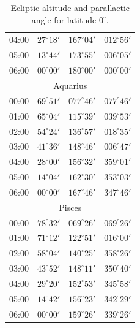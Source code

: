 \begin{table}[!h]
\begin{Parallel}{}{}
{{\begin{tabular}{l|lll}
04:00 & $27^\circ 18'$ & $167^\circ 04'$ & $012^\circ 56'$\\
05:00 & $13^\circ 44'$ & $173^\circ 55'$ & $006^\circ 05'$\\
06:00 & $00^\circ 00'$ & $180^\circ 00'$ & $000^\circ 00'$\\
\multicolumn{4}{c}{Aquarius}\\
00:00 & $69^\circ 51'$ & $077^\circ 46'$ & $077^\circ 46'$\\
01:00 & $65^\circ 04'$ & $115^\circ 39'$ & $039^\circ 53'$\\
02:00 & $54^\circ 24'$ & $136^\circ 57'$ & $018^\circ 35'$\\
03:00 & $41^\circ 36'$ & $148^\circ 46'$ & $006^\circ 47'$\\
04:00 & $28^\circ 00'$ & $156^\circ 32'$ & $359^\circ 01'$\\
05:00 & $14^\circ 04'$ & $162^\circ 30'$ & $353^\circ 03'$\\
06:00 & $00^\circ 00'$ & $167^\circ 46'$ & $347^\circ 46'$\\
\multicolumn{4}{c}{Pisces}\\
00:00 & $78^\circ 32'$ & $069^\circ 26'$ & $069^\circ 26'$\\
01:00 & $71^\circ 12'$ & $122^\circ 51'$ & $016^\circ 00'$\\
02:00 & $58^\circ 04'$ & $140^\circ 25'$ & $358^\circ 26'$\\
03:00 & $43^\circ 52'$ & $148^\circ 11'$ & $350^\circ 40'$\\
04:00 & $29^\circ 20'$ & $152^\circ 53'$ & $345^\circ 58'$\\
05:00 & $14^\circ 42'$ & $156^\circ 23'$ & $342^\circ 29'$\\
06:00 & $00^\circ 00'$ & $159^\circ 26'$ & $339^\circ 26'$\\
\end{tabular}
}}
\end{Parallel}
\caption{Ecliptic altitude and parallactic angle for latitude $0^\circ$.}\label{ltxx}
\end{table}

